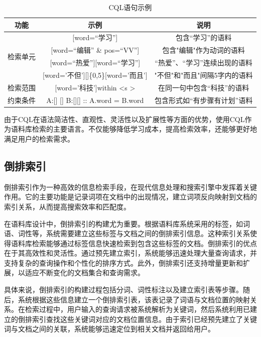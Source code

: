\documentclass[11pt]{article}
\begin{document}
\begin{CJK*}{UTF8}{gbsn}
\begin{table}[h]
	\begin{center}
		\begin{tabular}{c|c|c}
			\hline \bf 功能 & \bf 示例 & \bf 说明 \\ \hline
			\multirow{4}{*}{检索单元}& [word=“学习”] & 包含“学习”的语料 \\ \cline{2-3} & [word=“编辑” \& pos=“VV”] & 包含"编辑"作为动词的语料 \\ \cline{2-3}
			& [word=“热爱”][word=“学习”] & “热爱”、“学习”连续出现的语料  \\ \cline{2-3} & [word='不但'][]\{0,5\}[word='而且'] & "不但"和"而且"间隔5字内的语料 \\ \hline
			检索范围 & [word='科技']within \textless s \textgreater & 在同一句中包含“科技”的语料 \\ \cline{1-3}
			约束条件 & A:[] [] B:[][] :: A.word = B.word & 包含形式如“有步骤有计划”语料 \\
			\hline
		\end{tabular}
	\end{center}
	\caption{\label{cqltable} CQL语句示例}
\end{table}


由于CQL在语法简洁性、直观性、灵活性以及扩展性等方面的优势，使用CQL作为语料库检索的主要语言。不仅能够降低学习成本，提高检索效率，还能够更好地满足用户的检索需求。

\subsection{倒排索引}

倒排索引\cite{Salton1974A}作为一种高效的信息检索手段，在现代信息处理和搜索引擎中发挥着关键作用。它的主要功能是记录词项在文档中的出现情况，建立词项反向映射到文档的索引关系，从而提高搜索效率和匹配度。

在语料库设计中，倒排索引的构建尤为重要。根据语料库系统采用的标签，如词语、词性等，系统需要建立这些标签与文档之间的倒排索引信息。这种索引关系使得语料库检索能够通过标签信息快速检索到包含这些标签的文档。倒排索引的优点在于其高效性和灵活性。通过预先建立索引，系统能够迅速处理大量查询请求，并支持复杂的查询操作和个性化的排序方式。此外，倒排索引还支持增量更新和扩展，以适应不断变化的文档集合和查询需求。

具体来说，倒排索引的构建过程包括分词、词性标注以及建立索引表等步骤。随后，系统根据这些信息建立一个倒排索引表，该表记录了词语与文档位置的映射关系。在检索过程中，用户输入的查询请求被系统解析为关键词，然后系统利用已建立的倒排索引查找这些关键词对应的文档位置信息。由于索引已经预先建立了关键词与文档之间的关联，系统能够迅速定位到相关文档并返回给用户。


\end{CJK*}
\end{document}
